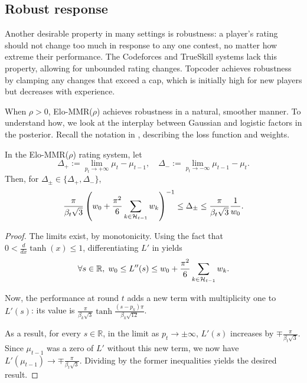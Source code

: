 \subsection{Robust response}
\label{sec:robust}

Another desirable property in many settings is robustness: a player's rating should not change too much in response to any one contest, no matter how extreme their performance. The Codeforces and TrueSkill systems lack this property, allowing for unbounded rating changes. Topcoder achieves robustness by clamping any changes that exceed a cap, which is initially high for new players but decreases with experience.

When $\rho>0$, Elo-MMR($\rho$) achieves robustness in a natural, smoother manner. To understand how, we look at the interplay between Gaussian and logistic factors in the posterior. Recall the notation in , describing the loss function and weights.

\begin{theorem}
\label{thm:robust}
In the Elo-MMR($\rho$) rating system, let
\[\Delta_+ := \lim_{p_t\rightarrow+\infty} \mu_{t}-\mu_{t-1},
\quad\Delta_- := \lim_{p_t\rightarrow-\infty}\mu_{t-1}-\mu_{t}.
\]
Then, for $\Delta_\pm \in \{\Delta_+, \Delta_-\}$,
\[\frac{\pi}{\beta_t\sqrt 3}
\left(w_0 + \frac{\pi^2}{6}\sum_{k\in{\mathcal{H}}_{t-1}}w_k \right)^{-1}
\le \Delta_\pm
\le \frac{\pi}{\beta_t\sqrt 3}\frac{1}{w_0}.\]
\end{theorem}

\begin{proof}
The limits exist, by monotonicity. Using the fact that $0 < \frac{d}{dx}\tanh(x) \le 1$, differentiating $L'$ in  yields
\[\forall s\in\mathbb R,\; w_0 \le L''(s)
\le w_0 + \frac{\pi^2}{6}\sum_{k\in{\mathcal{H}}_{t-1}}w_k.\]

Now, the performance at round $t$ adds a new term with multiplicity one to $L'(s)$: its value is
$\frac{\pi}{\beta_k\sqrt{3}} \tanh \frac{(s-p_k)\pi}{\beta_k\sqrt{12}}$.

As a result, for every $s\in\mathbb R$, in the limit as $p_t\rightarrow\pm\infty$, $L'(s)$ increases by $\mp\frac{\pi}{\beta_t\sqrt 3}$. Since $\mu_{t-1}$ was a zero of $L'$ without this new term, we now have
$L'(\mu_{t-1}) \rightarrow \mp\frac{\pi}{\beta_t\sqrt 3}.$ Dividing by the former inequalities yields the desired result.
\end{proof}

